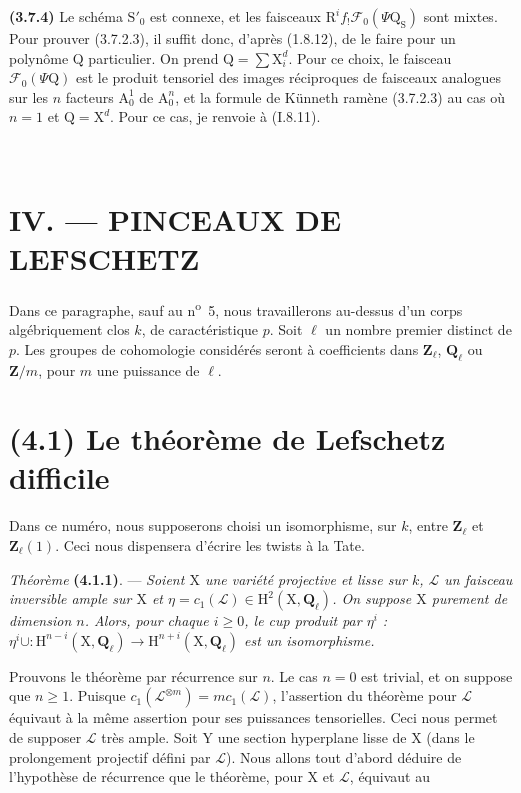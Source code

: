 \documentclass[11pt,leqno]{article}
\newcommand{\Page}[1]{\ifvmode\noindent\else\unskip\ \fi{\footnotesize\textcolor{gray}{[p.\,#1]}}\ \ignorespaces}
\begin{document}
\textbf{(3.7.4)} Le schéma \(\mathrm S'_0\) est connexe, et les faisceaux \(\mathrm R^if_!\mathscr F_0(\Psi\mathrm Q_{\mathrm S})\) sont mixtes. Pour prouver (3.7.2.3), il suffit donc, d’après (1.8.12), de le faire pour un polynôme \(\mathrm Q\) particulier. On prend \(\mathrm Q=\sum\mathrm X_i^d\). Pour ce choix, le faisceau \(\mathscr F_0(\Psi\mathrm Q)\) est le produit tensoriel des images réciproques de faisceaux analogues sur les \(n\) facteurs \(\mathrm A_0^1\) de \(\mathrm A_0^n\), et la formule de Künneth ramène (3.7.2.3) au cas où \(n=1\) et \(\mathrm Q=\mathrm X^d\). Pour ce cas, je renvoie à (I.8.11).

\Page{217}
\section*{IV. — PINCEAUX DE LEFSCHETZ}

Dans ce paragraphe, sauf au n\textsuperscript{o}~5, nous travaillerons au-dessus d’un corps algébriquement clos \(k\), de caractéristique \(p\). Soit \(\ell\) un nombre premier distinct de \(p\). Les groupes de cohomologie considérés seront à coefficients dans \(\mathbf{Z}_\ell\), \(\mathbf{Q}_\ell\) ou \(\mathbf{Z}/m\), pour \(m\) une puissance de \(\ell\).

\section*{(4.1) Le théorème de Lefschetz difficile}

Dans ce numéro, nous supposerons choisi un isomorphisme, sur \(k\), entre \(\mathbf{Z}_\ell\) et \(\mathbf{Z}_\ell(1)\). Ceci nous dispensera d’écrire les twists à la Tate.

\textit{Théorème} \textbf{(4.1.1)}. — \textit{Soient \(\mathrm{X}\) une variété projective et lisse sur \(k\), \(\mathscr{L}\) un faisceau inversible ample sur \(\mathrm{X}\) et \(\eta=c_1(\mathscr{L})\in\mathrm{H}^2(\mathrm{X},\mathbf{Q}_\ell)\). On suppose \(\mathrm{X}\) purement de dimension \(n\). Alors, pour chaque \(i\geq0\), le cup produit par \(\eta^i\) : \(\eta^i\cup:\mathrm{H}^{n-i}(\mathrm{X},\mathbf{Q}_\ell)\to\mathrm{H}^{n+i}(\mathrm{X},\mathbf{Q}_\ell)\) est un isomorphisme.}

Prouvons le théorème par récurrence sur \(n\). Le cas \(n=0\) est trivial, et on suppose que \(n\geq1\). Puisque \(c_1(\mathscr{L}^{\otimes m})=mc_1(\mathscr{L})\), l’assertion du théorème pour \(\mathscr{L}\) équivaut à la même assertion pour ses puissances tensorielles. Ceci nous permet de supposer \(\mathscr{L}\) très ample. Soit \(\mathrm{Y}\) une section hyperplane lisse de \(\mathrm{X}\) (dans le prolongement projectif défini par \(\mathscr{L}\)). Nous allons tout d’abord déduire de l’hypothèse de récurrence que le théorème, pour \(\mathrm{X}\) et \(\mathscr{L}\), équivaut au
\end{document}
